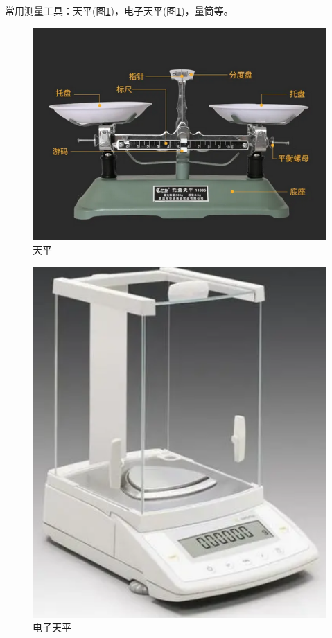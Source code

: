\documentclass[windows,csize4]{BHCexam}
\begin{document}
\begin{groups}
常用测量工具：天平(图\ref{fig:fig_1_11})，电子天平(图\ref{fig:fig_1_11})，量筒等。
\begin{figure}[htb]
    \centering
    \includegraphics [scale=0.5,trim=0 0 0 0]{./image/fig_1_11.PNG}
    \caption{天平} 
    \label{fig:fig_1_11}
\end{figure}
\begin{figure}[htb]
    \centering
    \includegraphics [scale=0.5,trim=0 0 0 0]{./image/fig_1_12.PNG}
    \caption{电子天平} 
    \label{fig:fig_1_12}
\end{figure}


\end{groups}
\end{document}
